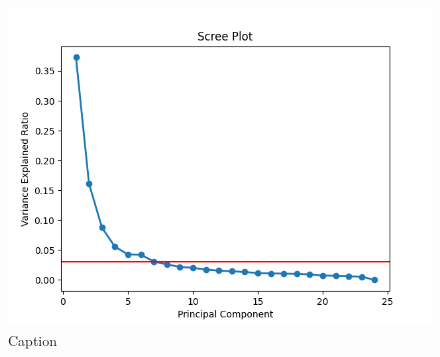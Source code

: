 \documentclass{article}
\begin{document}
\begin{figure}[H]
    \centering
    \includegraphics[scale=0.5]{1f/Scree.png}
    \caption{Caption}
    \label{scree 1f}
\end{figure}
\end{document}
